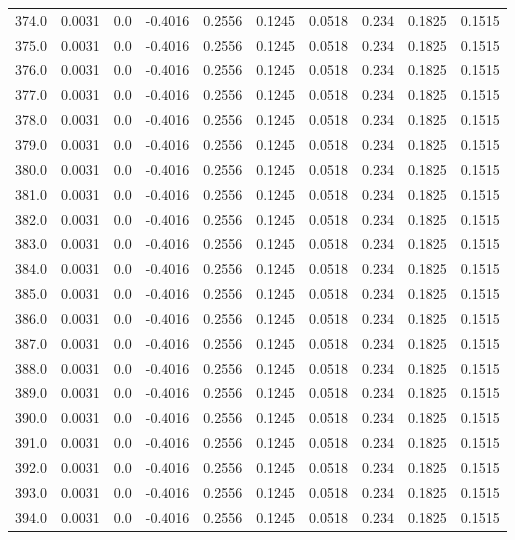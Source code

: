 \begin{longtable}{lrrrrrrrrr}
374.0 & 0.0031 & 0.0 & -0.4016 & 0.2556 & 0.1245 & 0.0518 & 0.234 & 0.1825 & 0.1515 \\
375.0 & 0.0031 & 0.0 & -0.4016 & 0.2556 & 0.1245 & 0.0518 & 0.234 & 0.1825 & 0.1515 \\
376.0 & 0.0031 & 0.0 & -0.4016 & 0.2556 & 0.1245 & 0.0518 & 0.234 & 0.1825 & 0.1515 \\
377.0 & 0.0031 & 0.0 & -0.4016 & 0.2556 & 0.1245 & 0.0518 & 0.234 & 0.1825 & 0.1515 \\
378.0 & 0.0031 & 0.0 & -0.4016 & 0.2556 & 0.1245 & 0.0518 & 0.234 & 0.1825 & 0.1515 \\
379.0 & 0.0031 & 0.0 & -0.4016 & 0.2556 & 0.1245 & 0.0518 & 0.234 & 0.1825 & 0.1515 \\
380.0 & 0.0031 & 0.0 & -0.4016 & 0.2556 & 0.1245 & 0.0518 & 0.234 & 0.1825 & 0.1515 \\
381.0 & 0.0031 & 0.0 & -0.4016 & 0.2556 & 0.1245 & 0.0518 & 0.234 & 0.1825 & 0.1515 \\
382.0 & 0.0031 & 0.0 & -0.4016 & 0.2556 & 0.1245 & 0.0518 & 0.234 & 0.1825 & 0.1515 \\
383.0 & 0.0031 & 0.0 & -0.4016 & 0.2556 & 0.1245 & 0.0518 & 0.234 & 0.1825 & 0.1515 \\
384.0 & 0.0031 & 0.0 & -0.4016 & 0.2556 & 0.1245 & 0.0518 & 0.234 & 0.1825 & 0.1515 \\
385.0 & 0.0031 & 0.0 & -0.4016 & 0.2556 & 0.1245 & 0.0518 & 0.234 & 0.1825 & 0.1515 \\
386.0 & 0.0031 & 0.0 & -0.4016 & 0.2556 & 0.1245 & 0.0518 & 0.234 & 0.1825 & 0.1515 \\
387.0 & 0.0031 & 0.0 & -0.4016 & 0.2556 & 0.1245 & 0.0518 & 0.234 & 0.1825 & 0.1515 \\
388.0 & 0.0031 & 0.0 & -0.4016 & 0.2556 & 0.1245 & 0.0518 & 0.234 & 0.1825 & 0.1515 \\
389.0 & 0.0031 & 0.0 & -0.4016 & 0.2556 & 0.1245 & 0.0518 & 0.234 & 0.1825 & 0.1515 \\
390.0 & 0.0031 & 0.0 & -0.4016 & 0.2556 & 0.1245 & 0.0518 & 0.234 & 0.1825 & 0.1515 \\
391.0 & 0.0031 & 0.0 & -0.4016 & 0.2556 & 0.1245 & 0.0518 & 0.234 & 0.1825 & 0.1515 \\
392.0 & 0.0031 & 0.0 & -0.4016 & 0.2556 & 0.1245 & 0.0518 & 0.234 & 0.1825 & 0.1515 \\
393.0 & 0.0031 & 0.0 & -0.4016 & 0.2556 & 0.1245 & 0.0518 & 0.234 & 0.1825 & 0.1515 \\
394.0 & 0.0031 & 0.0 & -0.4016 & 0.2556 & 0.1245 & 0.0518 & 0.234 & 0.1825 & 0.1515 \\

\end{longtable}
